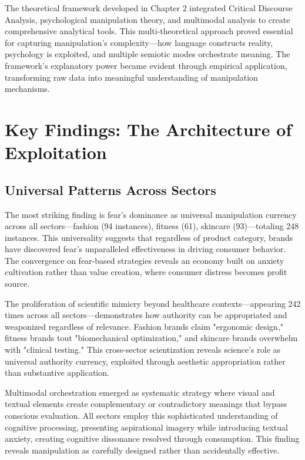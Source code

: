 The theoretical framework developed in Chapter 2 integrated Critical Discourse Analysis, psychological manipulation theory, and multimodal analysis to create comprehensive analytical tools. This multi-theoretical approach proved essential for capturing manipulation's complexity—how language constructs reality, psychology is exploited, and multiple semiotic modes orchestrate meaning. The framework's explanatory power became evident through empirical application, transforming raw data into meaningful understanding of manipulation mechanisms.

\section{Key Findings: The Architecture of Exploitation}
\label{sec:key_findings}

\subsection{Universal Patterns Across Sectors}

The most striking finding is fear's dominance as universal manipulation currency across all sectors—fashion (94 instances), fitness (61), skincare (93)—totaling 248 instances. This universality suggests that regardless of product category, brands have discovered fear's unparalleled effectiveness in driving consumer behavior. The convergence on fear-based strategies reveals an economy built on anxiety cultivation rather than value creation, where consumer distress becomes profit source.

The proliferation of scientific mimicry beyond healthcare contexts—appearing 242 times across all sectors—demonstrates how authority can be appropriated and weaponized regardless of relevance. Fashion brands claim "ergonomic design," fitness brands tout "biomechanical optimization," and skincare brands overwhelm with "clinical testing." This cross-sector scientization reveals science's role as universal authority currency, exploited through aesthetic appropriation rather than substantive application.

Multimodal orchestration emerged as systematic strategy where visual and textual elements create complementary or contradictory meanings that bypass conscious evaluation. All sectors employ this sophisticated understanding of cognitive processing, presenting aspirational imagery while introducing textual anxiety, creating cognitive dissonance resolved through consumption. This finding reveals manipulation as carefully designed rather than accidentally effective.

